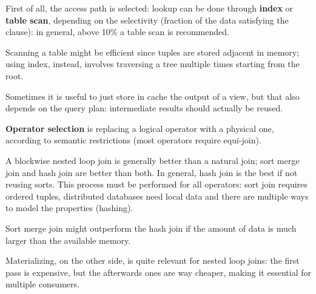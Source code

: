 First of all, the access path is selected: lookup can be done through \textbf{index} or \textbf{table scan}, depending on the selectivity (fraction of the data satisfying the clause): in general, above 10\% a table scan is recommended. 

Scanning a table might be efficient since tuples are stored adjacent in memory; using index, instead, involves traversing a tree multiple times starting from the root. 

Sometimes it is useful to just store in cache the output of a view, but that also depends on the query plan: intermediate results should actually be reused.

\textbf{Operator selection} is replacing a logical operator with a physical one, according to semantic restrictions (most operators require equi-join).

A blockwise nested loop join is generally better than a natural join; sort merge join and hash join are better than both. In general, hash join is the best if not reusing sorts. This process must be performed for all operators: sort join requires ordered tuples, distributed databases need local data and there are multiple ways to model the properties (hashing).

Sort merge join might outperform the hash join if the amount of data is much larger than the available memory.

Materializing, on the other side, is quite relevant for nested loop joins: the first pass is expensive, but the afterwards ones are way cheaper, making it essential for multiple consumers. 
